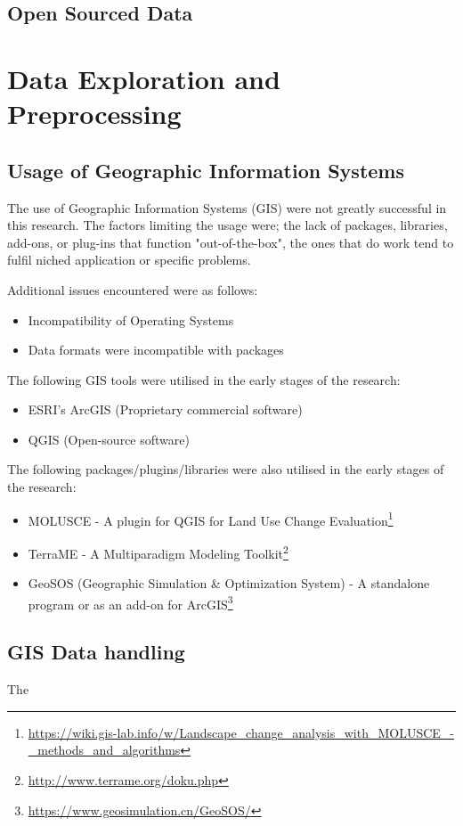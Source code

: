 \subsection{Open Sourced Data}
\section{Data Exploration and Preprocessing}
\subsection{Usage of Geographic Information Systems}
The use of Geographic Information Systems (GIS) were not greatly successful in this research. The factors limiting the usage were; the lack of packages, libraries, add-ons, or plug-ins that function "out-of-the-box", the ones that do work tend to fulfil niched application or specific problems.

Additional issues encountered were as follows:
\begin{itemize}
\item Incompatibility of Operating Systems
\item Data formats were incompatible with packages
\end{itemize}
The following GIS tools were utilised in the early stages of the research:
\begin{itemize}
\item ESRI's ArcGIS (Proprietary commercial software)
\item QGIS (Open-source software)
\end{itemize}

The following packages/plugins/libraries were also utilised in the early stages of the research:
\begin{itemize}
\item MOLUSCE - A plugin for QGIS for Land Use Change Evaluation\footnote{\url{https://wiki.gis-lab.info/w/Landscape_change_analysis_with_MOLUSCE_-_methods_and_algorithms}}
\item TerraME - A Multiparadigm Modeling Toolkit\footnote{\url{http://www.terrame.org/doku.php}}
\item GeoSOS (Geographic Simulation \& Optimization System) - A standalone program or as an add-on for ArcGIS\footnote{\url{https://www.geosimulation.cn/GeoSOS/}}
\end{itemize}
\subsection{GIS Data handling}
The 